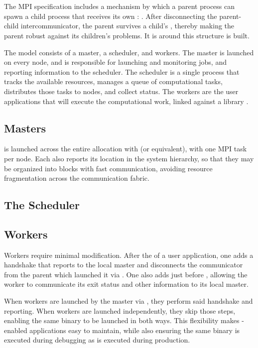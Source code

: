 \section{\mpijm}

The MPI specification\cite{MPI} includes a mechanism by which a parent process can spawn a child process that receives its own \mpicommworld: \spawn.
After disconnecting the parent-child intercommunicator, the parent survives a child's \mpiabort, thereby making the parent robust against its children's problems.
It is around this structure \mpijm is built.

The \mpijm model consists of a master, a scheduler, and workers.
The master \jmmaster is launched on every node, and is responsible for launching and monitoring jobs, and reporting information to the scheduler.
The scheduler \jmscheduler is a single process that tracks the available resources, manages a queue of computational tasks, distributes those tasks to nodes, and collect status.
The workers are the user applications that will execute the computational work, linked against a library \jmworker.

\subsection{Masters}

\jmmaster is launched across the entire allocation with \mpirun (or equivalent), with one MPI task per node.
Each \jmmaster also reports its location in the system hierarchy, so that they may be organized into blocks with fast communication, avoiding resource fragmentation across the communication fabric.

\subsection{The Scheduler}

\subsection{Workers}

Workers require minimal modification.
After the \mpiinit of a user application, one adds a handshake \jmhandshake that reports to the local master and disconnects the communicator from the parent which launched it via \spawn.
One also adds \jmfinish just before \mpifinalize, allowing the worker to communicate its exit status and other information to its local master.

When workers are launched by the master via \spawn, they perform said handshake and reporting.
When workers are launched independently, they skip those steps, enabling the same binary to be launched in both ways.
This flexibility makes \mpijm-enabled applications easy to maintain, while also ensuring the same binary is executed during debugging as is executed during production.

